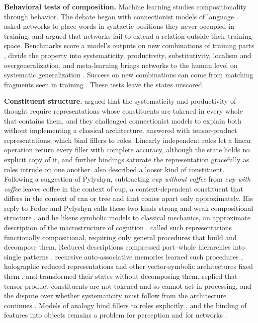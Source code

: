\documentclass[10pt]{article}
\theoremstyle{plain}
\theoremstyle{remark}
\begin{document}
\textbf{Behavioral tests of composition.} Machine learning studies compositionality through behavior. The debate began with connectionist models of language \citep{rumelhart1986,pinker1988,elman1990}. \citet{hadley1994} asked networks to place words in syntactic positions they never occupied in training, and \citet{marcus1998} argued that networks fail to extend a relation outside their training space. Benchmarks score a model's outputs on new combinations of training parts \citep{lake2018,keysers2020}, \citet{hupkes2020} divide the property into systematicity, productivity, substitutivity, localism and overgeneralization, and meta-learning brings networks to the human level on systematic generalization \citep{lake2023}. Success on new combinations can come from matching fragments seen in training \citep{dziri2023}. These tests leave the states unscored.

\textbf{Constituent structure.} \citet{fodor1988} argued that the systematicity and productivity of thought require representations whose constituents are tokened in every whole that contains them, and they challenged connectionist models to explain both without implementing a classical architecture. \citet{smolensky1990} answered with tensor-product representations, which bind fillers to roles. Linearly independent roles let a linear operation return every filler with complete accuracy, although the state holds no explicit copy of it, and further bindings saturate the representation gracefully as roles intrude on one another. \citet{smolensky1988} also described a looser kind of constituent. Following a suggestion of Pylyshyn, subtracting \emph{cup without coffee} from \emph{cup with coffee} leaves coffee in the context of cup, a context-dependent constituent that differs in the context of can or tree and that comes apart only approximately. His reply to Fodor and Pylyshyn calls these two kinds strong and weak compositional structure \citep{smolensky1987}, and he likens symbolic models to classical mechanics, an approximate description of the macrostructure of cognition \citep{smolensky1988}. \citet{vangelder1990} called such representations functionally compositional, requiring only general procedures that build and decompose them. Reduced descriptions compressed part--whole hierarchies into single patterns \citep{hinton1990}, recursive auto-associative memories learned such procedures \citep{pollack1990}, holographic reduced representations and other vector-symbolic architectures fixed them \citep{plate1995,gayler2006,kanerva2009}, and \citet{chalmers1990} transformed their states without decomposing them. \citet{fodor1990} replied that tensor-product constituents are not tokened and so cannot act in processing, and the dispute over whether systematicity must follow from the architecture continues \citep{goodale2026}. Models of analogy bind fillers to roles explicitly \citep{hummel1997}, and the binding of features into objects remains a problem for perception and for networks \citep{treisman1980,greff2020}.
\end{document}
